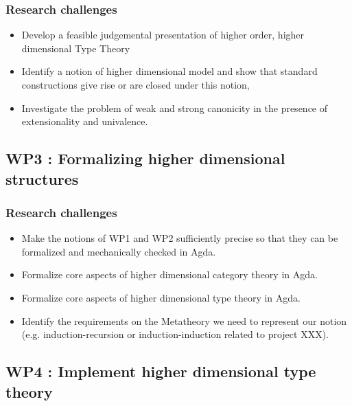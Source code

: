 \documentclass[a4paper]{article}
\begin{document}
\subsubsection*{Research challenges}
\label{sec:rsearch-challenges}

\begin{itemize}
\item Develop a feasible judgemental presentation of higher order,
  higher dimensional Type Theory

\item Identify a notion of higher dimensional model and show that
  standard constructions give rise or are closed under this notion,

\item Investigate the problem of weak and strong canonicity
  in the presence of extensionality and univalence.
\end{itemize}


\subsection*{WP3 : Formalizing higher dimensional structures} 
\label{sec:wp:qio}

\subsubsection*{Research challenges}
\label{sec:rsearch-challenges}

\begin{itemize}
\item Make the notions of WP1 and WP2 sufficiently precise so that they
  can be formalized and mechanically checked in Agda.

\item Formalize core aspects of higher dimensional category theory in
  Agda.

\item Formalize core aspects of higher dimensional type theory in Agda.

\item Identify the requirements on the Metatheory we need to represent
  our notion (e.g. induction-recursion or induction-induction related
  to project XXX).

\end{itemize}

\subsection*{WP4 : Implement higher dimensional type theory} 
\label{sec:wp:qio}
\end{document}
